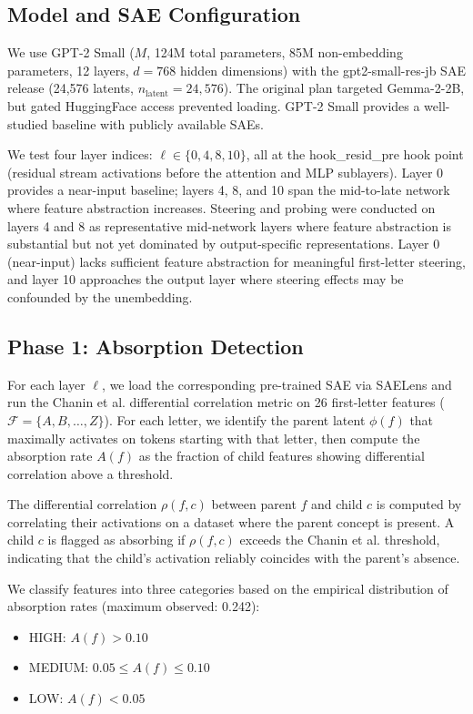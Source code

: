 \documentclass{article}
\begin{document}
\subsection{Model and SAE Configuration}

We use GPT-2 Small ($M$, 124M total parameters, 85M non-embedding parameters, 12 layers, $d = 768$ hidden dimensions) with the gpt2-small-res-jb SAE release (24,576 latents, $n_{\text{latent}} = 24{,}576$). The original plan targeted Gemma-2-2B, but gated HuggingFace access prevented loading. GPT-2 Small provides a well-studied baseline with publicly available SAEs.

We test four layer indices: $\ell \in \{0, 4, 8, 10\}$, all at the hook\_resid\_pre hook point (residual stream activations before the attention and MLP sublayers). Layer 0 provides a near-input baseline; layers 4, 8, and 10 span the mid-to-late network where feature abstraction increases. Steering and probing were conducted on layers 4 and 8 as representative mid-network layers where feature abstraction is substantial but not yet dominated by output-specific representations. Layer 0 (near-input) lacks sufficient feature abstraction for meaningful first-letter steering, and layer 10 approaches the output layer where steering effects may be confounded by the unembedding.

\subsection{Phase 1: Absorption Detection}

For each layer $\ell$, we load the corresponding pre-trained SAE via SAELens and run the Chanin et al. differential correlation metric on 26 first-letter features ($\mathcal{F} = \{A, B, \ldots, Z\}$). For each letter, we identify the parent latent $\phi(f)$ that maximally activates on tokens starting with that letter, then compute the absorption rate $A(f)$ as the fraction of child features showing differential correlation above a threshold.

The differential correlation $\rho(f, c)$ between parent $f$ and child $c$ is computed by correlating their activations on a dataset where the parent concept is present. A child $c$ is flagged as absorbing if $\rho(f, c)$ exceeds the Chanin et al. threshold, indicating that the child's activation reliably coincides with the parent's absence.

We classify features into three categories based on the empirical distribution of absorption rates (maximum observed: 0.242):
\begin{itemize}
    \item HIGH: $A(f) > 0.10$
    \item MEDIUM: $0.05 \leq A(f) \leq 0.10$
    \item LOW: $A(f) < 0.05$
\end{itemize}
\end{document}
